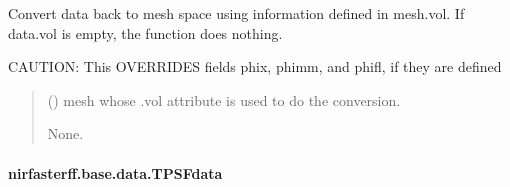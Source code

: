 \documentclass[letterpaper,10pt,english]{sphinxmanual}
\begin{document}
\begin{fulllineitems}
\begin{fulllineitems}
\label{\detokenize{_autosummary/nirfasterff.base.data.FLdata:nirfasterff.base.data.FLdata.tomesh}}
\pysigstartsignatures
{}
\pysigstopsignatures
\sphinxAtStartPar
Convert data back to mesh space using information defined in mesh.vol. If data.vol is empty, the function does nothing.

\sphinxAtStartPar
CAUTION: This OVERRIDES fields phix, phimm, and phifl, if they are defined
\begin{quote}\begin{description}
\sphinxAtStartPar
{} () \textendash{} mesh whose .vol attribute is used to do the conversion.

\sphinxAtStartPar
None.

\end{description}\end{quote}

\end{fulllineitems}


\end{fulllineitems}


\sphinxstepscope


\paragraph{nirfasterff.base.data.TPSFdata}
\label{\detokenize{_autosummary/nirfasterff.base.data.TPSFdata:nirfasterff-base-data-tpsfdata}}\label{\detokenize{_autosummary/nirfasterff.base.data.TPSFdata::doc}}
\end{document}

